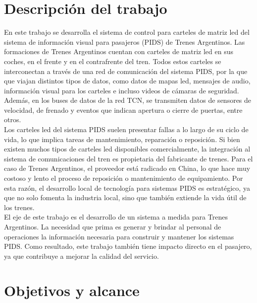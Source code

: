 \section{Descripción del trabajo}

En este trabajo se desarrolla el sistema de control para carteles de matriz led del sistema de información visual para pasajeros (PIDS) de Trenes Argentinos. Las formaciones de Trenes Argentinos cuentan con carteles de matriz led en sus coches, en el frente y en el contrafrente del tren. Todos estos carteles se interconectan a través de una red de comunicación del sistema PIDS, por la que que viajan distintos tipos de datos, como datos de mapas led, mensajes de audio, información visual para los carteles e incluso videos de cámaras de seguridad. Además, en los buses de datos de la red TCN, se transmiten datos de sensores de velocidad, de frenado y eventos que indican apertura o cierre de puertas, entre otros. \\

Los carteles led del sistema PIDS suelen presentar fallas a lo largo de su ciclo de vida, lo que implica tareas de mantenimiento, reparación o reposición. Si bien existen muchos tipos de carteles led disponibles comercialmente, la integración al sistema de comunicaciones del tren es propietaria del fabricante de trenes. Para el caso de Trenes Argentinos, el proveedor está radicado en China, lo que hace muy costoso y lento el proceso de reposición o mantenimiento de equipamiento. Por esta razón, el desarrollo local de tecnología para sistemas PIDS es estratégico, ya que no solo fomenta la industria local, sino que también extiende la vida útil de los trenes.\\


El eje de este trabajo es el desarrollo de un sistema a medida para Trenes Argentinos. La necesidad que prima es generar y brindar al personal de operaciones la información necesaria para construir y mantener los sistemas PIDS. Como resultado, este trabajo también tiene impacto directo en el pasajero, ya que contribuye a mejorar la calidad del servicio.\\


\section{Objetivos y alcance}

